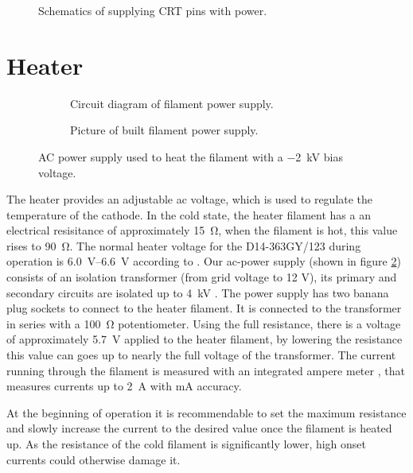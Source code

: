 \begin{figure}[H]
	\centering
	
	\begin{circuitikz}[european]
		
	\end{circuitikz}

	\caption{Schematics of supplying CRT pins with power.}
	\label{fig:schematics of wiring}
\end{figure}


\section{Heater}
\label{sec:Heater}

\begin{figure}[ht]
	\centering
	
	\begin{subfigure}[b]{0.9\textwidth}
		\begin{circuitikz}%
			
		\end{circuitikz}
		\caption{Circuit diagram of filament power supply.}
	\end{subfigure}
	
	\vspace{1cm}

	\begin{subfigure}[b]{0.9\textwidth}
		\caption{Picture of built filament power supply.}
	\end{subfigure}
	
	\caption{AC power supply used to heat the filament with a \SI{-2}{\kilo\volt} bias voltage.}
	\label{fig:heater_circuit}
\end{figure}

The heater provides an adjustable ac voltage, which is used to regulate the temperature of the cathode. In the cold state, the heater filament has a an electrical resisitance of approximately \SI{15}{\ohm}, when the filament is hot, this value rises to \SI{90}{\ohm}. The normal heater voltage for the D14-363GY/123 during  operation is \SIrange{6.0}{6.6}{\volt} according to \cite{D14363GY123-manual}. 
Our ac-power supply (shown in figure \ref{fig:heater_circuit}) consists of an isolation transformer (from grid voltage to 12 V), its primary  and secondary circuits are isolated up to \SI{4}{\kilo\volt} \cite{DS44231-DataSheet}. The power supply has two  banana plug sockets to connect to the heater filament. 
It is connected to the transformer in series with a \SI{100}{\ohm} potentiometer. Using the full resistance, there is a voltage of approximately \SI{5.7}{\volt} applied to the heater filament, by lowering the resistance this value can goes up to nearly the full voltage of the transformer. 
The current running through the filament is measured with an integrated ampere meter \cite{ACA-20PC-manual}, that measures currents up to  \SI{2}{\ampere} with \si{\milli\ampere} accuracy.

At the beginning of operation it is recommendable to set the maximum resistance and slowly increase the current to the desired value once the filament is heated up. As the resistance of the cold filament is significantly lower, high onset currents could otherwise damage it.  